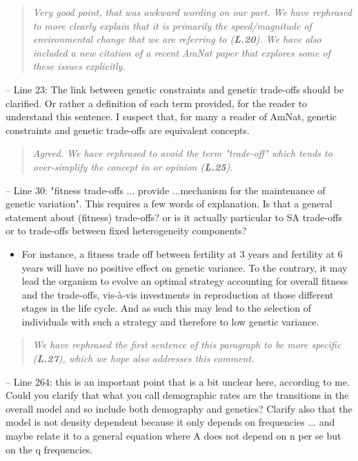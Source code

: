 \documentclass[11pt]{article}
\begin{document}
\begin{quote}
	{\itshape Very good point, that was awkward wording on our part. We have rephrased to more clearly explain that it is primarily the speed/magnitude of environmental change that we are referring to ({\bf L.20}). We have also included a new citation of a recent AmNat paper that explores some of these issues explicitly.}
\end{quote}


\noindent -- Line 23: The link between genetic constraints and genetic trade-offs should be clarified. Or rather a definition of each term provided, for the reader to understand this sentence. I suspect that, for many a reader of AmNat, genetic constraints and genetic trade-offs are equivalent concepts.

\begin{quote}
	{\itshape Agreed. We have rephrased to avoid the term "trade-off" which tends to over-simplify the concept in or opinion ({\bf L.25}).}
\end{quote}

\noindent -- Line 30: "fitness trade-offs ... provide ...mechanism for the maintenance of genetic variation". This requires a few words of explanation. Is that a general statement about (fitness) trade-offs? or is it actually particular to SA trade-offs or to trade-offs between fixed heterogeneity components?
\begin{itemize}
	\item For instance, a fitness trade off between fertility at 3 years and fertility at 6 years will have no positive effect on genetic variance. To the contrary, it may lead the organism to evolve an optimal strategy accounting for overall fitness and the trade-offs, vis-à-vis investments in reproduction at those different stages in the life cycle. And as such this may lead to the selection of individuals with such a strategy and therefore to low genetic variance.
\end{itemize}

\begin{quote}
	{\itshape We have rephrased the first sentence of this paragraph to be more specific ({\bf L.27}), which we hope also addresses this comment.}
\end{quote}


\noindent -- Line 264: this is an important point that is a bit unclear here, according to me. Could you clarify that what you call demographic rates are the transitions in the overall model and so include both demography and genetics? Clarify also that the model is not density dependent because it only depends on frequencies ... and maybe relate it to a general equation where A does not depend on n per se but on the q frequencies.
\end{document}
